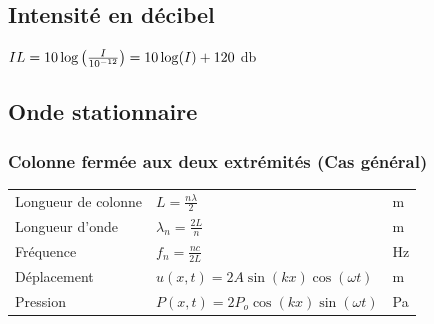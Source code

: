 

\subsection{Intensité en décibel}
\begin{center}
    \(IL=10\log\qty(\frac{I}{10^{-12}})=10\log(I)+120\) \si{\decibel}    
\end{center}

\subsection{Onde stationnaire}

\subsubsection{Colonne fermée aux deux extrémités (Cas général)}
\begin{tabular}{lll}
Longueur de colonne & \(L=\frac{n\lambda}{2}\) & \si{\meter}\\[8pt]
Longueur d'onde & \(\lambda_{n}=\frac{2L}{n}\) & \si{\meter}\\[8pt]
Fréquence & \(f_{n}=\frac{nc}{2L}\) & \si{\hertz}\\[8pt]
Déplacement & \(u(x,t)=2A\sin(kx)\cos(\omega t)\) & \si{\meter}\\[5pt]
Pression & \(P(x,t)=2P_{o}\cos(kx)\sin(\omega t)\) & \si{\pascal}
\end{tabular}

